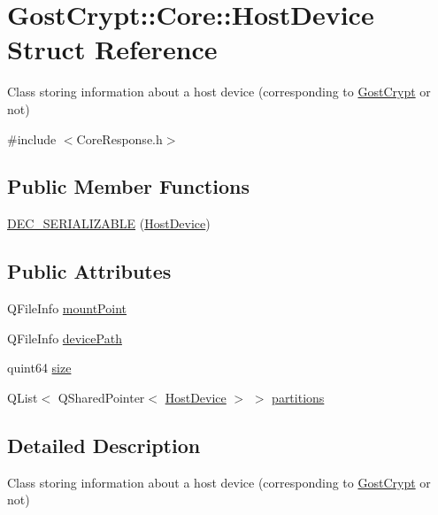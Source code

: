 \hypertarget{struct_gost_crypt_1_1_core_1_1_host_device}{}\section{Gost\+Crypt\+:\+:Core\+:\+:Host\+Device Struct Reference}
\label{struct_gost_crypt_1_1_core_1_1_host_device}


Class storing information about a host device (corresponding to \hyperlink{namespace_gost_crypt}{Gost\+Crypt} or not)  




{\ttfamily \#include $<$Core\+Response.\+h$>$}

\subsection*{Public Member Functions}
\begin{DoxyCompactItemize}
\item 
\hyperlink{struct_gost_crypt_1_1_core_1_1_host_device_aa8a98b8cf658cf2aeba6b5d2c7497afa}{D\+E\+C\+\_\+\+S\+E\+R\+I\+A\+L\+I\+Z\+A\+B\+LE} (\hyperlink{struct_gost_crypt_1_1_core_1_1_host_device}{Host\+Device})
\end{DoxyCompactItemize}
\subsection*{Public Attributes}
\begin{DoxyCompactItemize}
\item 
Q\+File\+Info \hyperlink{struct_gost_crypt_1_1_core_1_1_host_device_a591592a14eccfbef276006c08789585b}{mount\+Point}
\item 
Q\+File\+Info \hyperlink{struct_gost_crypt_1_1_core_1_1_host_device_ad1e20d2be3b61cfff3767a3065e5820c}{device\+Path}
\item 
quint64 \hyperlink{struct_gost_crypt_1_1_core_1_1_host_device_accd94a05c9922635acf8d9a940fbaaff}{size}
\item 
Q\+List$<$ Q\+Shared\+Pointer$<$ \hyperlink{struct_gost_crypt_1_1_core_1_1_host_device}{Host\+Device} $>$ $>$ \hyperlink{struct_gost_crypt_1_1_core_1_1_host_device_aa47420a7fe2df4a275e5a17be9fbee2d}{partitions}
\end{DoxyCompactItemize}


\subsection{Detailed Description}
Class storing information about a host device (corresponding to \hyperlink{namespace_gost_crypt}{Gost\+Crypt} or not) 


